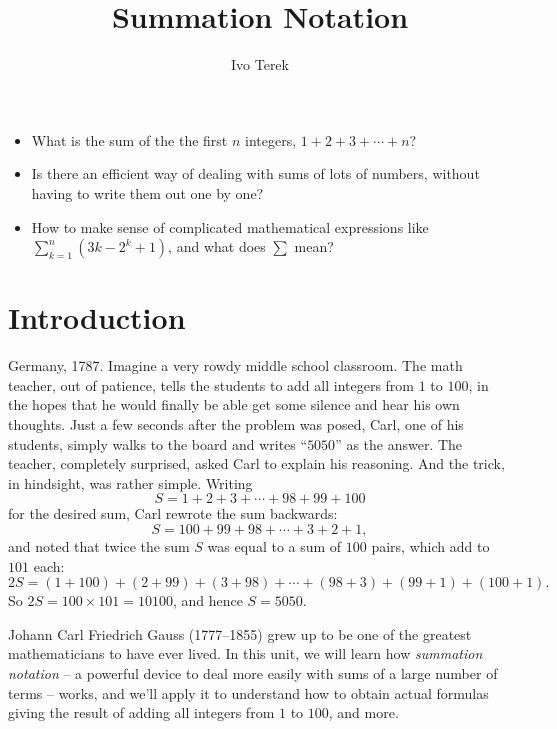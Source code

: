 \documentclass[nooutcomes]{ximera}
\author{Ivo Terek}
\title{Summation Notation}
\begin{document}
\begin{abstract}
  
\end{abstract}
\maketitle

\begin{motivatingQuestions}\begin{itemize}
  \item What is the sum of the the first $n$ integers, $1+2+3+\cdots + n$?
  \item Is there an efficient way of dealing with sums of lots of numbers, without having to write them out one by one?
  \item How to make sense of complicated mathematical expressions like $\sum_{k=1}^n (3k-2^k+1)$, and what does $\sum$ mean?
\end{itemize}\end{motivatingQuestions}

\section{Introduction}

Germany, 1787. Imagine a very rowdy middle school classroom. The math teacher, out of patience, tells the students to add all integers from $1$ to $100$, in the hopes that he would finally be able get some silence and hear his own thoughts. Just a few seconds after the problem was posed, Carl, one of his students, simply walks to the board and writes ``$5050$'' as the answer. The teacher, completely surprised, asked Carl to explain his reasoning. And the trick, in hindsight, was rather simple. Writing $$S=1+2+3+\cdots + 98+99+100$$for the desired sum, Carl rewrote the sum backwards: $$S = 100+99+98+\cdots+3+2+1,$$and noted that twice the sum $S$ was equal to a sum of $100$ pairs, which add to $101$ each: $$2S = (1+100)+(2+99)+(3+98)+\cdots +(98+3)+(99+1)+(100+1).$$So $2S = 100 \times 101  =10100$, and hence $S=5050$.

Johann Carl Friedrich Gauss (1777--1855) grew up to be one of the greatest mathematicians to have ever lived. In this unit, we will learn how \emph{summation notation} -- a powerful device to deal more easily with sums of a large number of terms -- works, and we'll apply it to understand how to obtain actual formulas giving the result of adding all integers from $1$ to $100$, and more.
\end{document}
